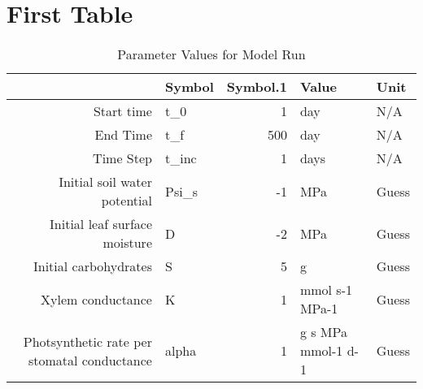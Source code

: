 \documentclass[a4paper]{article}
\begin{document}
\section{First Table}

\begin{table}[ht]
\begin{center}
\begin{tabular}{rlrll}
  \hline
 & Symbol & Symbol.1 & Value & Unit \\ 
  \hline
Start time & t\_0 &   1 & day & N/A \\ 
  End Time & t\_f & 500 & day & N/A \\ 
  Time Step & t\_inc &   1 & days & N/A \\ 
  Initial soil water potential & Psi\_s &  -1 & MPa & Guess \\ 
  Initial leaf surface moisture & D &  -2 & MPa & Guess \\ 
  Initial carbohydrates & S &   5 & g & Guess \\ 
  Xylem conductance & K &   1 & mmol s-1 MPa-1 & Guess \\ 
  Photsynthetic rate per stomatal conductance & alpha &   1 & g s MPa mmol-1 d-1 & Guess \\ 
   \hline
\end{tabular}
\caption{Parameter Values for Model Run}
\end{center}
\end{table}
\end{document}
